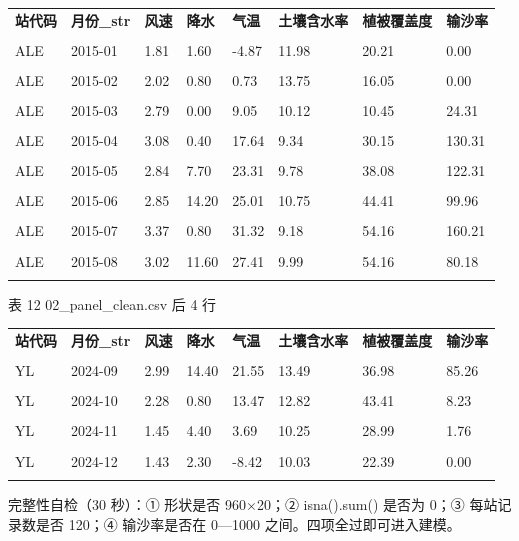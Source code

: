 \documentclass[11pt,a4paper]{ctexart}
\begin{document}
\begin{table}[H]\centering\small\setlength{\parskip}{2pt}
\begin{tabularx}{\textwidth}{|X|X|X|X|X|X|X|X|}
\toprule
\textbf{站代码} & \textbf{月份\_str} & \textbf{风速} & \textbf{降水} & \textbf{气温} & \textbf{土壤含水率} & \textbf{植被覆盖度} & \textbf{输沙率} \\\\
\midrule
ALE & 2015-01 & 1.81 & 1.60 & -4.87 & 11.98 & 20.21 & 0.00 \\\\
ALE & 2015-02 & 2.02 & 0.80 & 0.73 & 13.75 & 16.05 & 0.00 \\\\
ALE & 2015-03 & 2.79 & 0.00 & 9.05 & 10.12 & 10.45 & 24.31 \\\\
ALE & 2015-04 & 3.08 & 0.40 & 17.64 & 9.34 & 30.15 & 130.31 \\\\
ALE & 2015-05 & 2.84 & 7.70 & 23.31 & 9.78 & 38.08 & 122.31 \\\\
ALE & 2015-06 & 2.85 & 14.20 & 25.01 & 10.75 & 44.41 & 99.96 \\\\
ALE & 2015-07 & 3.37 & 0.80 & 31.32 & 9.18 & 54.16 & 160.21 \\\\
ALE & 2015-08 & 3.02 & 11.60 & 27.41 & 9.99 & 54.16 & 80.18 \\\\
\bottomrule
\end{tabularx}
\end{table}
表 12  02\_panel\_clean.csv 后 4 行


\begin{table}[H]\centering\small\setlength{\parskip}{2pt}
\begin{tabularx}{\textwidth}{|X|X|X|X|X|X|X|X|}
\toprule
\textbf{站代码} & \textbf{月份\_str} & \textbf{风速} & \textbf{降水} & \textbf{气温} & \textbf{土壤含水率} & \textbf{植被覆盖度} & \textbf{输沙率} \\\\
\midrule
YL & 2024-09 & 2.99 & 14.40 & 21.55 & 13.49 & 36.98 & 85.26 \\\\
YL & 2024-10 & 2.28 & 0.80 & 13.47 & 12.82 & 43.41 & 8.23 \\\\
YL & 2024-11 & 1.45 & 4.40 & 3.69 & 10.25 & 28.99 & 1.76 \\\\
YL & 2024-12 & 1.43 & 2.30 & -8.42 & 10.03 & 22.39 & 0.00 \\\\
\bottomrule
\end{tabularx}
\end{table}
完整性自检（30 秒）：① 形状是否 960$\times$20；② isna().sum() 是否为 0；③ 每站记录数是否 120；④ 输沙率是否在 0—1000 之间。四项全过即可进入建模。
\end{document}
